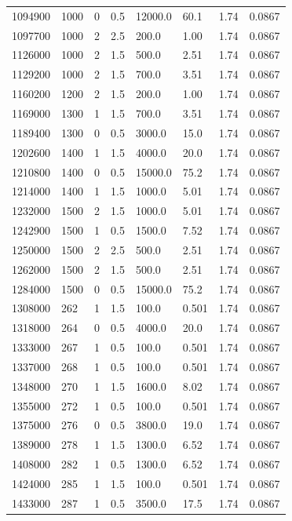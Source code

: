 \documentclass[preview]{standalone}
\begin{document}
{{{{\begin{tabular}{L{1.2cm}C{1.2cm} C{0.3cm}C{0.5cm} C{1.4cm}C{1.4cm} C{1.4cm}C{1.4cm}}
  1094900  &  1000  & 0     & 0.5 &  12000.0  & 60.1  & 1.74 &  0.0867   \\ 
  1097700  &  1000  & 2     & 2.5 &  200.0  & 1.00  & 1.74 &  0.0867   \\ 
  1126000  &  1000  & 2     & 1.5 &  500.0  & 2.51  & 1.74 &  0.0867   \\ 
  1129200  &  1000  & 2     & 1.5 &  700.0  & 3.51  & 1.74 &  0.0867   \\ 
  1160200  &  1200  & 2     & 1.5 &  200.0  & 1.00  & 1.74 &  0.0867   \\ 
  1169000  &  1300  & 1     & 1.5 &  700.0  & 3.51  & 1.74 &  0.0867   \\ 
  1189400  &  1300  & 0     & 0.5 &  3000.0  & 15.0  & 1.74 &  0.0867   \\ 
  1202600  &  1400  & 1     & 1.5 &  4000.0  & 20.0  & 1.74 &  0.0867   \\ 
  1210800  &  1400  & 0     & 0.5 &  15000.0  & 75.2  & 1.74 &  0.0867   \\ 
  1214000  &  1400  & 1     & 1.5 &  1000.0  & 5.01  & 1.74 &  0.0867   \\ 
  1232000  &  1500  & 2     & 1.5 &  1000.0  & 5.01  & 1.74 &  0.0867   \\ 
  1242900  &  1500  & 1     & 0.5 &  1500.0  & 7.52  & 1.74 &  0.0867   \\ 
  1250000  &  1500  & 2     & 2.5 &  500.0  & 2.51  & 1.74 &  0.0867   \\ 
  1262000  &  1500  & 2     & 1.5 &  500.0  & 2.51  & 1.74 &  0.0867   \\ 
  1284000  &  1500  & 0     & 0.5 &  15000.0  & 75.2  & 1.74 &  0.0867   \\ 
  1308000  &   262  & 1     & 1.5 &  100.0  & 0.501  & 1.74 &  0.0867   \\ 
  1318000  &   264  & 0     & 0.5 &  4000.0  & 20.0  & 1.74 &  0.0867   \\ 
  1333000  &   267  & 1     & 0.5 &  100.0  & 0.501  & 1.74 &  0.0867   \\ 
  1337000  &   268  & 1     & 0.5 &  100.0  & 0.501  & 1.74 &  0.0867   \\ 
  1348000  &   270  & 1     & 1.5 &  1600.0  & 8.02  & 1.74 &  0.0867   \\ 
  1355000  &   272  & 1     & 0.5 &  100.0  & 0.501  & 1.74 &  0.0867   \\ 
  1375000  &   276  & 0     & 0.5 &  3800.0  & 19.0  & 1.74 &  0.0867   \\ 
  1389000  &   278  & 1     & 1.5 &  1300.0  & 6.52  & 1.74 &  0.0867   \\ 
  1408000  &   282  & 1     & 0.5 &  1300.0  & 6.52  & 1.74 &  0.0867   \\ 
  1424000  &   285  & 1     & 1.5 &  100.0  & 0.501  & 1.74 &  0.0867   \\ 
  1433000  &   287  & 1     & 0.5 &  3500.0  & 17.5  & 1.74 &  0.0867   \\ 
\hline 
\end{tabular} 

}}}}
\end{document}
